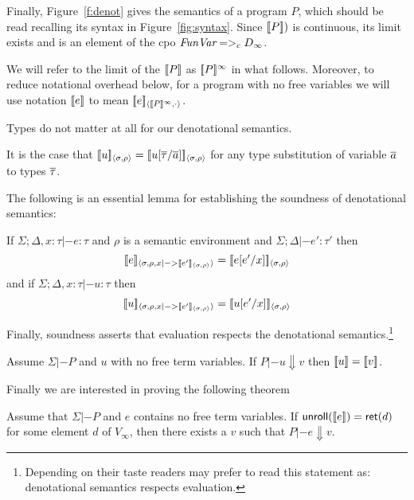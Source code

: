 Finally, Figure~\ref{f:denot} gives the semantics of a program $P$, which should
be read recalling its syntax in Figure~\ref{fig:syntax}.
Since $[\![P]\!])$ is continuous, its limit exists and is an element of the 
cpo $\textit{FunVar} =>_c D_{\infty}$.

\begin{definition}
We will refer to the limit of the $[\![P]\!]$ as $[\![P]\!]^{\infty}$ in what follows. 
Moreover, to reduce notational overhead below, for a program with no free variables we 
will use notation $[\![e]\!]$ to mean $[\![e]\!]_{\langle {[\![P]\!]^\infty},{\cdot}\rangle}$.
\end{definition}

Types do not matter at all for our denotational semantics.
\begin{lemma}
It is the case that $[\![u]\!]_{\langle {\sigma},{\rho}\rangle} = [\![u[\overline{\tau}/\overline{a}]]\!]_{\langle {\sigma},{\rho}\rangle}$ 
for any type substitution of variable $\overline{a}$ to types $\overline{\tau}$.
\end{lemma}
The following is an essential lemma for establishing the soundness of denotational semantics:
\begin{lemma}[Substitutivity]
If $\Sigma;\Delta,x{:}\tau |- e : \tau$ and $\rho$ is a semantic environment 
and $\Sigma;\Delta |- e' : \tau'$ then 
\[ [\![e]\!]_{\langle {\sigma},{\rho,x |-> [\![e']\!]_{\langle {\sigma},{\rho}\rangle}}\rangle} = [\![e[e'/x]]\!]_{\langle {\sigma},{\rho}\rangle} \]
and if $\Sigma;\Delta,x{:}\tau |- u : \tau$ then 
\[ [\![u]\!]_{\langle {\sigma},{\rho,x |-> [\![e']\!]_{\langle {\sigma},{\rho}\rangle}}\rangle} = [\![u[e'/x]]\!]_{\langle {\sigma},{\rho}\rangle} \]
\end{lemma}
Finally, soundness asserts that evaluation respects the denotational semantics.\footnote{Depending on their taste
readers may prefer to read this statement as: denotational semantics respects evaluation.}
\begin{lemma}
Assume $\Sigma |- P$ and $u$ with no free term variables. If $P |- u \Downarrow v$ then $[\![u]\!] = [\![v]\!] $.
\end{lemma} 
Finally we are interested in proving the following theorem
\begin{theorem}\label{thm:adequacy}
Assume that $\Sigma |- P$ and $e$ contains no free term variables.
If $\mathsf{unroll}([\![e]\!]) = \mathsf{ret}(d)$ for some element $d$ of $V_{\infty}$, then 
there exists a $v$ such that $P |- e \Downarrow v$.
\end{theorem}

